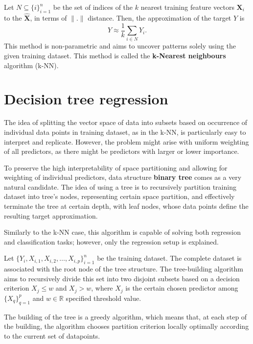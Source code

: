 Let $N \subseteq \{i\}_{i=1}^{n}$ be the set of indices of the $k$ nearest training feature vectors $\mathbf{X}_i$ to the $\mathbf{\hat{X}}$, in terms of $\|.\|$ distance. Then, the approximation of the target $Y$ is 
\begin{equation}
    Y \approx \frac{1}{k}\sum_{i \in N} Y_i.    
\end{equation}
This method is non-parametric and aims to uncover patterns solely using the given training dataset. This method is called the \textbf{k-Nearest neighbours} algorithm (k-NN). 

\section{Decision tree regression}

The idea of splitting the vector space of data into subsets based on occurrence of individual data points 
in training dataset, as in the k-NN, is particularly easy to interpret and replicate. However, 
the problem might arise with uniform weighting of all predictors, as there might 
be predictors with larger or lower importance.

To preserve the high interpretability of space partitioning and allowing for weighting of individual predictors, 
data structure \textbf{binary tree} comes as a very natural candidate. The idea of using a tree
is to recursively partition training dataset into tree's nodes, representing certain space partition, and effectively terminate the tree at certain 
depth, with leaf nodes, whose data points define the resulting target approximation.

Similarly to the k-NN case, this algorithm is capable of solving both regression and classification tasks; however,
only the regression setup is explained.

Let $\{ Y_i, X_{i, 1}, X_{i, 2}, \ldots, X_{i, p} \}_{i=1}^{n}$
be the training dataset. The complete dataset is associated with the root node of the tree structure. The tree-building algorithm aims to recursively divide this set
into two disjoint subsets based on a decision criterion $X_j \leq w$ and $X_j > w$, where $X_j$ is the certain chosen predictor among $\{X_q\}_{q=1}^{p}$
and $w \in \mathbb{R}$ specified threshold value.

The building of the tree is a greedy algorithm, which means that, at each step of the building, the algorithm chooses
partition criterion locally optimally according to the current set of datapoints.

